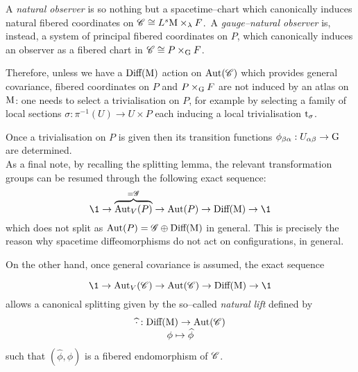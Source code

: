 A \emph{natural observer} is so nothing but a spacetime--chart which canonically induces natural fibered coordinates on $\mathscr{C}\cong L^s\text{\normalfont M}\times_\lambda F$.\, A \emph{gauge--natural observer} is, instead, a system of principal fibered coordinates on $P$, which canonically induces an observer as a fibered chart in $\mathscr{C}\cong P\times_{\text{\normalfont G}} F$. 

Therefore, unless we have a $\text{\normalfont Diff}(\text{\normalfont M})$ action on $\text{\normalfont Aut}(\mathscr{C})$ which provides general covariance, fibered coordinates on $P$ and $P\times_{\text{\normalfont G}} F$ are not induced by an atlas on $\text{\normalfont M}$: one needs to select a trivialisation on $P$, for example by selecting a family of local sections $\sigma:\pi^{-1}(U)\to U\times P$ each inducing a local trivialisation $\text{\normalfont t}_\sigma$. 

Once a trivialisation on $P$ is given then its transition functions $\phi_{\beta\alpha}:U_{\alpha\beta}\to\text{\normalfont G}$ are determined.\\



As a final note, by recalling the splitting lemma, the relevant transformation groups can be resumed through the following exact sequence:
$$\1\to\overbrace{\Aut_V(P)}^{=\mathscr{G}}\to\Aut(P)\to\Diffeo(\M)\to\1$$
which does not split as $\text{\normalfont Aut}(P)=\mathscr{G}\oplus\text{\normalfont Diff}(\text{\normalfont M})$ in general. This is precisely the reason why spacetime diffeomorphisms do not act on configurations, in general.

On the other hand, once general covariance is assumed, the exact sequence

$$\1\to\Aut_V(\Ci)\to\Aut(\Ci)\to\Diffeo(\M)\to\1$$
allows a canonical splitting given by the so--called \emph{natural lift} defined by
$$\begin{matrix}
    \widehat{\cdot}:\text{\normalfont Diff}(\text{\normalfont M})\to\text{\normalfont Aut}(\mathscr{C})\\
    \phi\mapsto\widehat{\phi}
\end{matrix}$$ 
such that $(\widehat{\phi},\phi)$ is a fibered endomorphism of $\mathscr{C}$.






    
